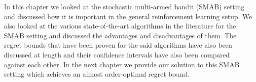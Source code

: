 In this chapter we looked at the stochastic multi-armed bandit (SMAB) setting and discussed how it is important in the general reinforcement learning setup. We also looked at the various state-of-the-art algorithms in the literature for the SMAB setting and discussed the advantages and disadvantages of them. The regret bounds that have been proven for the said algorithms have also been discussed at length and their confidence intervals have also been compared against each other. In the next chapter we provide our solution to this SMAB setting which achieves an almost order-optimal regret bound.